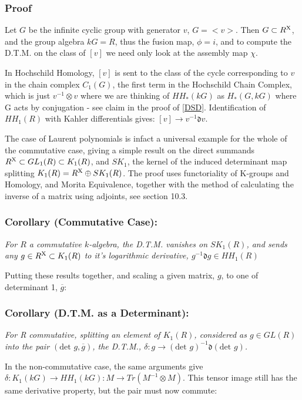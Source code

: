 \subsubsection*{Proof}
Let $G$ be the infinite cyclic group with generator $v$, $G=<v>$. Then $G\subset R^\text X$, and the group algebra $kG = R$, thus the fusion map, $\phi = i$, and to compute the D.T.M. on the class of $[v]$ we need only look at the assembly map $\chi$.

In Hochschild Homology, $[v]$ is sent to the class of the cycle corresponding to $v$ in the chain complex $C_1(G)$, the first term in the Hochschild Chain Complex, which is just $v^{-1}\otimes v$ where we are thinking of $HH_*(kG)$ as $H_*(G,kG)$ where G acts by conjugation - see claim in the proof of \ref{DSD}. Identification of $HH_1(R)$ with Kahler differentials gives: $[v]\rightarrow v^{-1}\mathfrak d v$.

The case of Laurent polynomials is infact a universal example for the whole of the commutative case, giving a simple result on the direct summands $R^\text X\subset GL_1(R)\subset K_1(R)$, and $SK_1$, the kernel of the induced determinant map splitting $K_1(R) = R^\text X \oplus SK_1(R)$. The proof uses functoriality of K-groups and Homology, and Morita Equivalence, together with the method of calculating the inverse of a matrix using adjoints, see \cite{R} section 10.3.

\subsubsection{Corollary (Commutative Case):}
\emph{For $R$ a commutative $k$-algebra, the D.T.M. vanishes on $SK_1(R)$, and sends any $g\in R^\text X \subset K_1(R)$ to it's logarithmic derivative, $g^{-1}\mathfrak d g\in HH_1(R)$}

Putting these results together, and scaling a given matrix, $g$, to one of determinant 1, $\overline g$:

\subsubsection{Corollary (D.T.M. as a Determinant):\label{dtmdet}}
\emph{For R commutative, splitting an element of $K_1(R)$, considered as $g\in GL(R)$ into the pair $(\text{det }g, \overline g)$, the D.T.M., $\delta: g \rightarrow (\text{det }g)^{-1}\mathfrak d (\text{det }g)$.}

\bigskip

In the non-commutative case, the same arguments give $\delta:K_1(kG)\rightarrow HH_1(kG):M\rightarrow Tr(M^{-1}\otimes M)$. This tensor image still has the same derivative property, but the pair must now commute:

